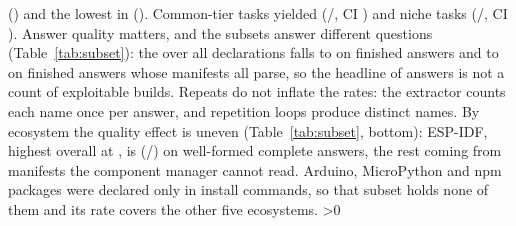 \documentclass[conference]{IEEEtran}
\begin{document}
(\rMaxEcoRate) and the lowest in \rMinEco{} (\rMinEcoRate). Common-tier tasks yielded \rPhantomCommon{}
(\rPhantomCommonK/\rPhantomCommonN, CI \rPhantomCommonCI) and niche tasks \rPhantomNiche{}
(\rPhantomNicheK/\rPhantomNicheN, CI \rPhantomNicheCI).
\fi
Answer quality matters, and the subsets answer different questions (Table~\ref{tab:subset}): the \rPhantomDecl{}
over all declarations falls to \rPhantomDeclNoTrunc{} on finished answers and to \rRateWellformed{} on finished answers
whose manifests all parse, so the headline \rPhantomResp{} of answers is not a count of exploitable builds. Repeats do
not inflate the rates: the extractor counts each name once per answer, and repetition loops produce distinct names.
By ecosystem the quality effect is uneven (Table~\ref{tab:subset}, bottom): ESP-IDF, highest overall at \rMaxEcoRate,
is \rWfEspP{} (\rWfEspK/\rWfEspN) on well-formed complete answers, the rest coming from manifests the component manager
cannot read. Arduino, MicroPython and npm packages were declared only in install commands, so that subset holds none of
them and its rate covers the other five ecosystems.
\ifnum\rCutText>0
\end{document}
